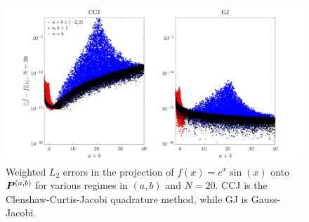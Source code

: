 \begin{figure}[H]
	\centering
	\includegraphics[width=1\linewidth]{./figures/aberr}
	\caption{Weighted $L_2$ errors in the projection of $f(x) = e^x\sin(x)$ onto $\boldsymbol{P}^{(a,b)}$ for various regimes in $(a,b)$ and $N=20$. CCJ is the Clenshaw-Curtis-Jacobi quadrature method, while GJ is Gauss-Jacobi.}\label{fig:aberrs}
\end{figure}

